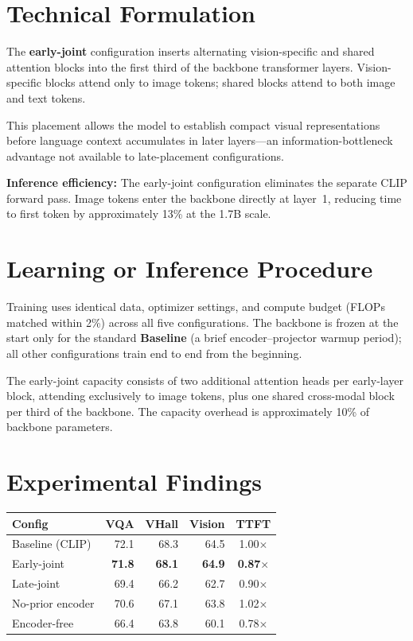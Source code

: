 \documentclass[10pt,twocolumn]{article}
\begin{document}
\section{Technical Formulation}

The \textbf{early-joint} configuration inserts alternating vision-specific and shared attention blocks into the first third of the backbone transformer layers.
Vision-specific blocks attend only to image tokens; shared blocks attend to both image and text tokens.

This placement allows the model to establish compact visual representations before language context accumulates in later layers---an information-bottleneck advantage not available to late-placement configurations.

\textbf{Inference efficiency:}
The early-joint configuration eliminates the separate CLIP forward pass.
Image tokens enter the backbone directly at layer~1, reducing time to first token by approximately 13\% at the 1.7B scale.

\section{Learning or Inference Procedure}

Training uses identical data, optimizer settings, and compute budget (FLOPs matched within 2\%) across all five configurations.
The backbone is frozen at the start only for the standard \textbf{Baseline} (a brief encoder--projector warmup period); all other configurations train end to end from the beginning.

The early-joint capacity consists of two additional attention heads per early-layer block, attending exclusively to image tokens, plus one shared cross-modal block per third of the backbone.
The capacity overhead is approximately 10\% of backbone parameters.

\section{Experimental Findings}

\begin{center}
\small
\begin{tabular}{lrrrc}
\toprule
\textbf{Config} & \textbf{VQA} & \textbf{VHall} & \textbf{Vision} & \textbf{TTFT} \\
\midrule
Baseline (CLIP) & 72.1 & 68.3 & 64.5 & 1.00$\times$ \\
Early-joint & \textbf{71.8} & \textbf{68.1} & \textbf{64.9} & \textbf{0.87$\times$} \\
Late-joint & 69.4 & 66.2 & 62.7 & 0.90$\times$ \\
No-prior encoder & 70.6 & 67.1 & 63.8 & 1.02$\times$ \\
Encoder-free & 66.4 & 63.8 & 60.1 & 0.78$\times$ \\
\bottomrule
\end{tabular}
\end{center}
\end{document}
